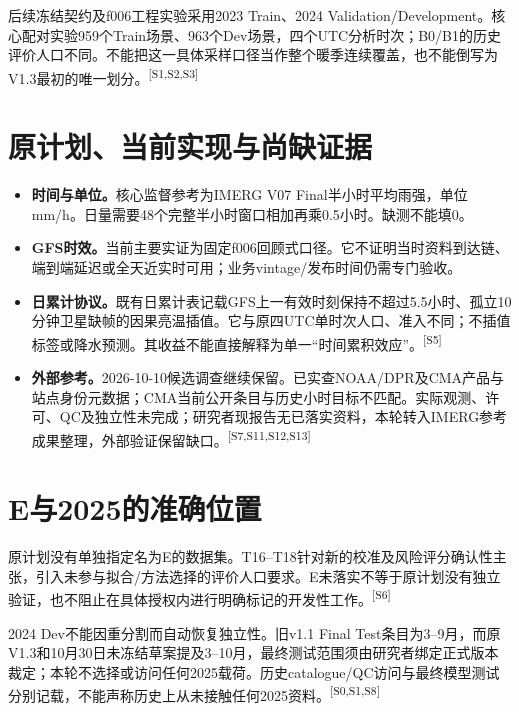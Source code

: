 \documentclass[UTF8,10.5pt,a4paper,fontset=none]{ctexart}
\newcommand{\evi}[1]{\textsuperscript{\color{muted}[#1]}}
\begin{document}
后续冻结契约及f006工程实验采用2023 Train、2024 Validation/Development。核心配对实验959个Train场景、963个Dev场景，四个UTC分析时次；B0/B1的历史评价人口不同。不能把这一具体采样口径当作整个暖季连续覆盖，也不能倒写为V1.3最初的唯一划分。\evi{S1,S2,S3}

\section*{原计划、当前实现与尚缺证据}
\begin{itemize}
\item \textbf{时间与单位。}核心监督参考为IMERG V07 Final半小时平均雨强，单位mm/h。日量需要48个完整半小时窗口相加再乘0.5小时。缺测不能填0。
\item \textbf{GFS时效。}当前主要实证为固定f006回顾式口径。它不证明当时资料到达链、端到端延迟或全天近实时可用；业务vintage/发布时间仍需专门验收。
\item \textbf{日累计协议。}既有日累计表记载GFS上一有效时刻保持不超过5.5小时、孤立10分钟卫星缺帧的因果亮温插值。它与原四UTC单时次人口、准入不同；不插值标签或降水预测。其收益不能直接解释为单一“时间累积效应”。\evi{S5}
\item \textbf{外部参考。}2026-10-10候选调查继续保留。已实查NOAA/DPR及CMA产品与站点身份元数据；CMA当前公开条目与历史小时目标不匹配。实际观测、许可、QC及独立性未完成；研究者现报告无已落实资料，本轮转入IMERG参考成果整理，外部验证保留缺口。\evi{S7,S11,S12,S13}
\end{itemize}
\section*{E与2025的准确位置}
原计划没有单独指定名为E的数据集。T16--T18针对新的校准及风险评分确认性主张，引入未参与拟合/方法选择的评价人口要求。E未落实不等于原计划没有独立验证，也不阻止在具体授权内进行明确标记的开发性工作。\evi{S6}

2024 Dev不能因重分割而自动恢复独立性。旧v1.1 Final Test条目为3--9月，而原V1.3和10月30日未冻结草案提及3--10月，最终测试范围须由研究者绑定正式版本裁定；本轮不选择或访问任何2025载荷。历史catalogue/QC访问与最终模型测试分别记载，不能声称历史上从未接触任何2025资料。\evi{S0,S1,S8}
\end{document}
